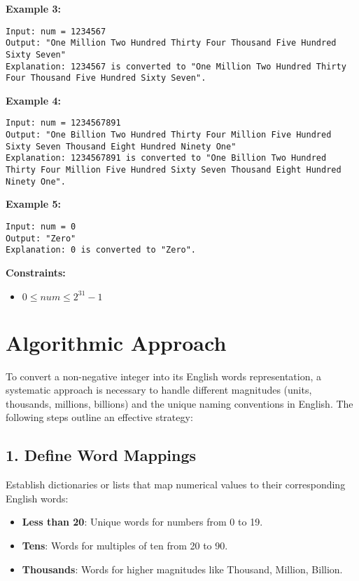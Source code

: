 \textbf{Example 3:}

\begin{verbatim}
Input: num = 1234567
Output: "One Million Two Hundred Thirty Four Thousand Five Hundred Sixty Seven"
Explanation: 1234567 is converted to "One Million Two Hundred Thirty Four Thousand Five Hundred Sixty Seven".
\end{verbatim}

\textbf{Example 4:}

\begin{verbatim}
Input: num = 1234567891
Output: "One Billion Two Hundred Thirty Four Million Five Hundred Sixty Seven Thousand Eight Hundred Ninety One"
Explanation: 1234567891 is converted to "One Billion Two Hundred Thirty Four Million Five Hundred Sixty Seven Thousand Eight Hundred Ninety One".
\end{verbatim}

\textbf{Example 5:}

\begin{verbatim}
Input: num = 0
Output: "Zero"
Explanation: 0 is converted to "Zero".
\end{verbatim}

\textbf{Constraints:}

\begin{itemize}
    \item \(0 \leq num \leq 2^{31} - 1\)
\end{itemize}



\section*{Algorithmic Approach}

To convert a non-negative integer into its English words representation, a systematic approach is necessary to handle different magnitudes (units, thousands, millions, billions) and the unique naming conventions in English. The following steps outline an effective strategy:

\subsection*{1. Define Word Mappings}

Establish dictionaries or lists that map numerical values to their corresponding English words:

\begin{itemize}
    \item \textbf{Less than 20}: Unique words for numbers from 0 to 19.
    \item \textbf{Tens}: Words for multiples of ten from 20 to 90.
    \item \textbf{Thousands}: Words for higher magnitudes like Thousand, Million, Billion.
\end{itemize}

